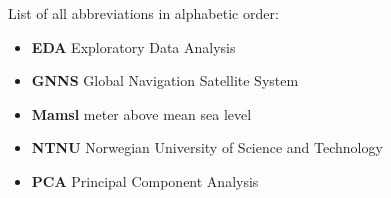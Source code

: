 
List of all abbreviations in alphabetic order:

\begin{itemize}
    \item \textbf{EDA} Exploratory Data Analysis
    \item \textbf{GNNS} Global Navigation Satellite System
    \item \textbf{Mamsl} meter above mean sea level
    \item \textbf{NTNU} Norwegian University of Science and Technology
    \item \textbf{PCA} Principal Component Analysis
    
\end{itemize}